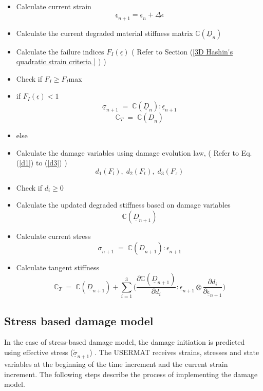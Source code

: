 \documentclass[12pt,a4paper,twoside,openright]{report}
\begin{document}
\begin{itemize}
\item Calculate current strain \textbf{$$ \underline{\epsilon}_{n+1} = \underline{\epsilon}_{n} + \underline{\Delta \epsilon} $$}
\item Calculate the current degraded material stiffness matrix  \textbf{$\mathbb{C}(\underline{D}_{n})$}
\item Calculate the failure indices \textbf{$F_{I}(\underline{\epsilon})$} \;\; ( Refer to Section (\ref{3D Hashin's quadratic strain criteria } ) )
\item[] Check if $F_{I} \geq F_{I}$max
\item if \textbf{$F_{I}(\underline{\epsilon})<1$} \textbf{$$\underline{\sigma}_{n+1} \; = \; \mathbb{C}(\underline{D}_{n}) :  \underline{\epsilon}_{n+1} $$} \textbf{$$\mathbb{C}_{T} \; = \; \mathbb{C}(\underline{D}_{n})$$}
\item else
\item[]  Calculate the damage variables using damage evolution law, \;\; ( Refer to Eq. (\ref{d1}) to (\ref{d3}) ) \textbf{$$d_{1}(F_{l}),\;d_{2}(F_{t}),\;d_{3}(F_{z})$$}
\item[]  Check if $d_{i} \geq 0 $ 
\item[]  Calculate the updated degraded stiffness based on damage variables \textbf{$$\mathbb{C}(\underline{D}_{n+1})$$}
\item[]  Calculate current stress  \textbf{$$\underline{\sigma}_{n+1} \; = \; \mathbb{C}(\underline{D}_{n+1}) :  \underline{\epsilon}_{n+1} $$}
\item[] Calculate tangent stiffness \textbf{$$\mathbb{C}_{T}  \; = \;\mathbb{C}(\underline{D}_{n+1}) + \sum_{i = 1}^{3} \Big( \frac{\partial \mathbb{C}(\underline{D}_{n+1}) }{\partial d_{i}} : \underline{\epsilon}_{n+1} \otimes \frac{\partial d_{i}}{\partial \underline{\epsilon}_{n+1} }\Big)$$}
	
\end{itemize} 


\subsection{Stress based damage model}\label{Stress based damage model}
\indent\indent\indent  In the case of stress-based damage model, the damage initiation is predicted using effective stress ($\underline{\tilde{\sigma}}_{n+1}$) \citep{jiang2018evaluations}.  The USERMAT receives strains, stresses and state variables at the beginning of the time increment and the current strain increment. The following steps describe the process of implementing the damage model.
\end{document}
